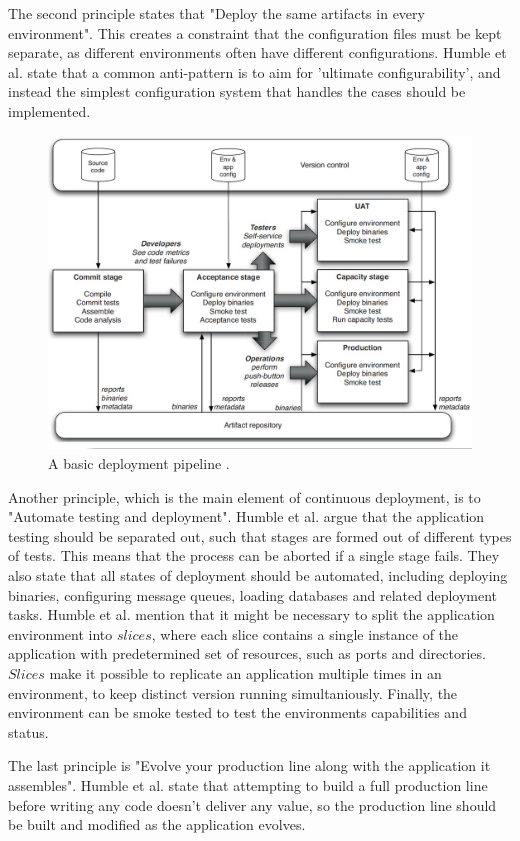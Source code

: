 \documentclass[english]{tktltiki2}
\theoremstyle{definition}
\theoremstyle{remark}
\begin{document}
The second principle states that "Deploy the same artifacts in every environment". This creates a constraint that the configuration files must be kept separate, as different environments often have different configurations. Humble et al. state that a common anti-pattern is to aim for 'ultimate configurability', and instead the simplest configuration system that handles the cases should be implemented.
\begin{figure}[h]
	\centering
	\includegraphics[width=5.0in]{pipeline.jpg}
	\caption{A basic deployment pipeline \cite{cdbook}.}
	\label{fig3}
\end{figure}
Another principle, which is the main element of continuous deployment, is to "Automate testing and deployment". Humble et al. argue that the application testing should be separated out, such that stages are formed out of different types of tests. This means that the process can be aborted if a single stage fails. They also state that all states of deployment should be automated, including deploying binaries, configuring message queues, loading databases and related deployment tasks. Humble et al. mention that it might be necessary to split the application environment into $slices$, where each slice contains a single instance of the application with predetermined set of resources, such as ports and directories. $Slices$ make it possible to replicate an application multiple times in an environment, to keep distinct version running simultaniously. Finally, the environment can be smoke tested to test the environments capabilities and status.

The last principle is "Evolve your production line along with the application it assembles". Humble et al. state that attempting to build a full production line before writing any code doesn't deliver any value, so the production line should be built and modified as the application evolves. 
\end{document}
